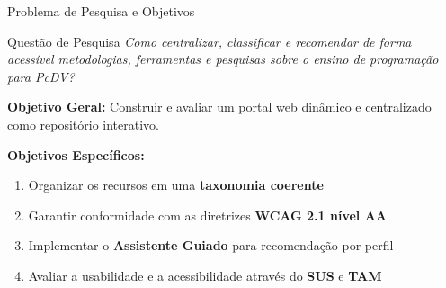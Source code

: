 \documentclass[aspectratio=169]{beamer}
\begin{document}
\begin{frame}{Problema de Pesquisa e Objetivos}
    \begin{block}{Questão de Pesquisa}
        \textit{Como centralizar, classificar e recomendar de forma acessível metodologias, ferramentas e pesquisas sobre o ensino de programação para PcDV?}
    \end{block}

    \vspace{0.15cm}

    \textbf{Objetivo Geral:} Construir e avaliar um portal web dinâmico e centralizado como repositório interativo.

    \vspace{0.15cm}

    \textbf{Objetivos Específicos:}
    \begin{enumerate}\small
        \item Organizar os recursos em uma \textbf{taxonomia coerente}
        \item Garantir conformidade com as diretrizes \textbf{WCAG 2.1 nível AA}
        \item Implementar o \textbf{Assistente Guiado} para recomendação por perfil
        \item Avaliar a usabilidade e a acessibilidade através do \textbf{SUS} e \textbf{TAM}
    \end{enumerate}

\end{frame}
\end{document}
